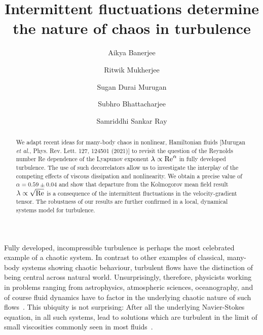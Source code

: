 \documentclass[amsmath,amssymb,amsbsy,pre,twocolumn,tightenlines,superscriptaddress,floatfix]{revtex4-2}
\begin{document}
\title{Intermittent fluctuations determine the nature of chaos in  turbulence}
\author{Aikya Banerjee}
\author{Ritwik Mukherjee}
\author{Sugan Durai Murugan}
\author{Subhro Bhattacharjee}
\author{Samriddhi Sankar Ray}

	\begin{abstract}
We adapt recent ideas for many-body chaos in nonlinear, Hamiltonian fluids
	[Murugan \textit{et al.}, Phys. Rev. Lett. 127, 124501 (2021)] to
	revisit the question of the Reynolds number Re dependence of the Lyapunov exponent $\lambda\propto{\rm Re}^\alpha$
	in fully developed turbulence. The use of such decorrelators
	allow us to investigate
	the interplay of the competing effects of viscous dissipation and nonlinearity. We obtain a precise value of $\alpha = 0.59 \pm 0.04$ and show that departure from the Kolmogorov
		mean field result
	$\lambda \propto \sqrt{{\rm Re}}$ is a consequence of the intermittent fluctuations in the velocity-gradient tensor. The robustness of our
	results are further confirmed in a local, dynamical systems model
	for turbulence.
\end{abstract}


\maketitle

Fully developed, incompressible turbulence is perhaps the most celebrated example of a chaotic
system. In contrast to other examples of classical, many-body
systems showing chaotic behaviour, turbulent flows have the distinction of
being central across natural world.
Unsurprisingly, therefore,
physicists working in problems ranging from astrophysics, atmospheric sciences,
oceanography, and of course fluid dynamics have to factor in the underlying
chaotic nature of such flows~\cite{Pandit-Pramana-Review}. This ubiquity is not surprising: After all the
underlying Navier-Stokes equation, in all such systems, lead to solutions which
are turbulent in the limit of small viscosities commonly seen in most fluids~\cite{Frisch_1995}.
\end{document}
